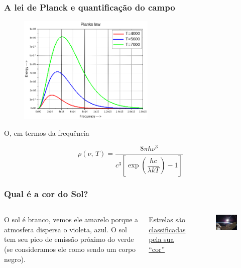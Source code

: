 \documentclass[12pt,brazil]{beamer}
\begin{document}

\begin{frame}
  \frametitle{A lei de Planck e quantificação do campo}
  
        \begin{figure}
          \includegraphics[width=6.5cm]{figuras/fig09}
        \end{figure}
        \fontsize{11pt}{11pt}\selectfont
  
    O, em termos da frequência
    
    \[
      \rho (\nu, \, T) = \dfrac{8\pi h \nu^3}{c^3\left[\exp \left(\dfrac{hc}{\lambda kT}\right) - 1\right]}
    \]
  
\end{frame}


\begin{frame}
  \frametitle{Qual é a cor do Sol?}
    \begin{columns}[c]


      \column{6cm}
        \fontsize{11pt}{11pt}\selectfont
        
        O sol é branco, vemos ele amarelo porque a atmosfera dispersa o violeta, azul. O sol tem seu pico de emissão próximo do verde (se consideramos ele como sendo um corpo negro).
        \vspace*{0.5cm}

        \href{https://phet.colorado.edu/sims/html/blackbody-spectrum/latest/blackbody-spectrum_all.html}{\color{blue} Estrelas são classificadas pela sua ``cor''}
      
      \column{4cm}
        \vspace*{-0.75cm}
        \begin{figure}
          \includegraphics[width=4.5cm]{figuras/fig10}
        \end{figure}
      
    \end{columns}
  
\end{frame}
\end{document}
